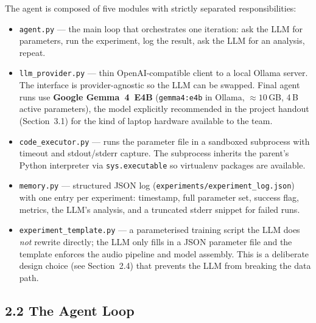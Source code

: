 \documentclass[11pt,a4paper]{article}
\begin{document}
The agent is composed of five modules with strictly separated responsibilities:
\begin{itemize}
\item \texttt{agent.py} --- the main loop that orchestrates one iteration: ask the LLM for parameters, run the experiment, log the result, ask the LLM for an analysis, repeat.
\item \texttt{llm\_provider.py} --- thin OpenAI-compatible client to a local Ollama server. The interface is provider-agnostic so the LLM can be swapped. Final agent runs use \textbf{Google Gemma~4~E4B} (\texttt{gemma4:e4b} in Ollama, $\approx 10$\,GB, 4\,B active parameters), the model explicitly recommended in the project handout (Section~3.1) for the kind of laptop hardware available to the team.
\item \texttt{code\_executor.py} --- runs the parameter file in a sandboxed subprocess with timeout and stdout/stderr capture. The subprocess inherits the parent's Python interpreter via \texttt{sys.executable} so virtualenv packages are available.
\item \texttt{memory.py} --- structured JSON log (\texttt{experiments/experiment\_log.json}) with one entry per experiment: timestamp, full parameter set, success flag, metrics, the LLM's analysis, and a truncated stderr snippet for failed runs.
\item \texttt{experiment\_template.py} --- a parameterised training script the LLM does \emph{not} rewrite directly; the LLM only fills in a JSON parameter file and the template enforces the audio pipeline and model assembly. This is a deliberate design choice (see Section~2.4) that prevents the LLM from breaking the data path.
\end{itemize}

\subsection*{2.2 The Agent Loop}
\end{document}
